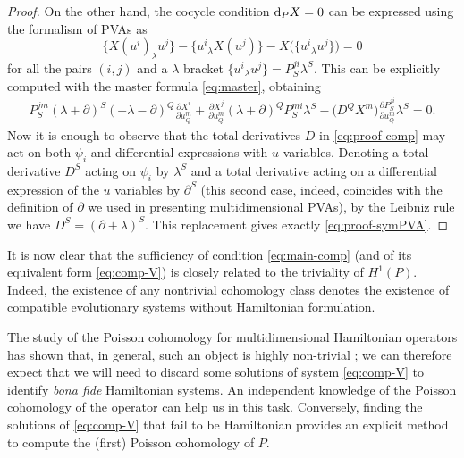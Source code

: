 \documentclass[pdftex]{sigma}
\numberwithin{equation}{section}
\begin{document}
\begin{proof}
On the other hand, the cocycle condition ${\rm d}_PX=0$ can be expressed using the formalism of PVAs \cite{casati2015deformations} as
\[%
\big\{X(u^i)_\lambda u^j\big\}-\big\{u^i{}_\lambda X(u^j)\big\}-X\big(\big\{u^i{}_\lambda u^j\big\}\big)=0
\]
for all the pairs $(i,j)$ and a $\lambda$ bracket $\{u^i{}_{\lambda}u^j\}=P^{ji}_S\lambda^S$. This can be explicitly computed with the master formula \eqref{eq:master}, obtaining
\begin{gather}\label{eq:proof-symPVA}
P^{jm}_S(\lambda+\partial)^S(-\lambda-\partial)^Q\frac{\partial X^i}{\partial u^m_Q}+\frac{\partial X^j}{\partial u^m_Q}(\lambda+\partial)^Q P^{mi}_S\lambda^S-\big(D^Q X^m\big)\frac{\partial P^{ji}_S}{\partial u^m_Q}\lambda^S=0.
\end{gather}
Now it is enough to observe that the total derivatives $D$ in \eqref{eq:proof-comp} may act on both $\psi_i$ and differential expressions with $u$ variables. Denoting a total derivative $D^S$ acting on $\psi_i$ by $\lambda^S$ and a total derivative acting on a differential expression of the $u$ variables by $\partial^S$ (this second case, indeed, coincides with the definition of $\partial$ we used in presenting multidimensional PVAs), by the Leibniz rule we have $D^S=(\partial+\lambda)^S$. This replacement gives exactly \eqref{eq:proof-symPVA}.
\end{proof}

It is now clear that the sufficiency of condition \eqref{eq:main-comp} (and of its equivalent form \eqref{eq:comp-V}) is closely related to the triviality of $H^1(P)$. Indeed, the existence of any nontrivial cohomology class denotes the existence of compatible evolutionary systems without Hamiltonian formulation.

The study of the Poisson cohomology for multidimensional Hamiltonian operators has shown that, in general, such an object is highly non-trivial \cite{ccs17,ccs18,casati2015deformations}; we can therefore expect that we will need to discard some solutions of system \eqref{eq:comp-V} to identify \emph{bona fide} Hamiltonian systems. An independent knowledge of the Poisson cohomology of the operator can help us in this task. Conversely, finding the solutions of \eqref{eq:comp-V} that fail to be Hamiltonian provides an explicit method to compute the (first) Poisson cohomology of $P$.
\end{document}
